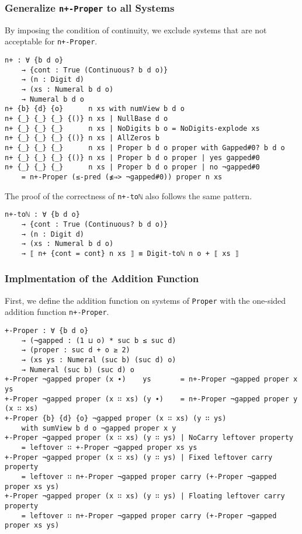 \documentclass[\main/thesis.tex]{subfiles}
\begin{document}
\subsubsection{Generalize \lstinline|n+-Proper| to all Systems}

By imposing the condition of continuity, we exclude systems that are not
acceptable for \lstinline|n+-Proper|.

\begin{lstlisting}[basicstyle=\ttfamily\scriptsize]
n+ : ∀ {b d o}
    → {cont : True (Continuous? b d o)}
    → (n : Digit d)
    → (xs : Numeral b d o)
    → Numeral b d o
n+ {b} {d} {o}      n xs with numView b d o
n+ {_} {_} {_} {()} n xs | NullBase d o
n+ {_} {_} {_}      n xs | NoDigits b o = NoDigits-explode xs
n+ {_} {_} {_} {()} n xs | AllZeros b
n+ {_} {_} {_}      n xs | Proper b d o proper with Gapped#0? b d o
n+ {_} {_} {_} {()} n xs | Proper b d o proper | yes gapped#0
n+ {_} {_} {_}      n xs | Proper b d o proper | no ¬gapped#0
    = n+-Proper (≤-pred (≰⇒> ¬gapped#0)) proper n xs
\end{lstlisting}

The proof of the correctness of \lstinline|n+-toℕ| also follows the same pattern.

\begin{lstlisting}
n+-toℕ : ∀ {b d o}
    → {cont : True (Continuous? b d o)}
    → (n : Digit d)
    → (xs : Numeral b d o)
    → ⟦ n+ {cont = cont} n xs ⟧ ≡ Digit-toℕ n o + ⟦ xs ⟧
\end{lstlisting}

\subsubsection{Implmentation of the Addition Function}

First, we define the addition function on systems of \lstinline|Proper| with
the one-sided addition function \lstinline|n+-Proper|.

\begin{lstlisting}[basicstyle=\ttfamily\scriptsize]
+-Proper : ∀ {b d o}
    → (¬gapped : (1 ⊔ o) * suc b ≤ suc d)
    → (proper : suc d + o ≥ 2)
    → (xs ys : Numeral (suc b) (suc d) o)
    → Numeral (suc b) (suc d) o
+-Proper ¬gapped proper (x ∙)    ys       = n+-Proper ¬gapped proper x ys
+-Proper ¬gapped proper (x ∷ xs) (y ∙)    = n+-Proper ¬gapped proper y (x ∷ xs)
+-Proper {b} {d} {o} ¬gapped proper (x ∷ xs) (y ∷ ys)
    with sumView b d o ¬gapped proper x y
+-Proper ¬gapped proper (x ∷ xs) (y ∷ ys) | NoCarry leftover property
    = leftover ∷ +-Proper ¬gapped proper xs ys
+-Proper ¬gapped proper (x ∷ xs) (y ∷ ys) | Fixed leftover carry property
    = leftover ∷ n+-Proper ¬gapped proper carry (+-Proper ¬gapped proper xs ys)
+-Proper ¬gapped proper (x ∷ xs) (y ∷ ys) | Floating leftover carry property
    = leftover ∷ n+-Proper ¬gapped proper carry (+-Proper ¬gapped proper xs ys)
\end{lstlisting}
\end{document}
